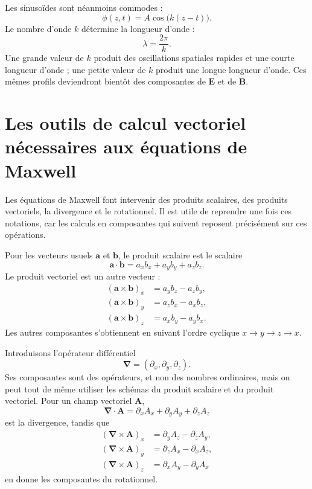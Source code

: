 Les sinusoïdes sont néanmoins commodes :
\begin{equation}
\phi(z,t)=A\cos\!\bigl(k(z-t)\bigr).
\end{equation}
Le nombre d’onde \(k\) détermine la longueur d’onde :
\begin{equation}
\lambda=\frac{2\pi}{k}.
\end{equation}
Une grande valeur de \(k\) produit des oscillations spatiales rapides et une courte longueur d’onde ; une petite valeur de \(k\) produit une longue longueur d’onde. Ces mêmes profils deviendront bientôt des composantes de \(\mathbf E\) et de \(\mathbf B\).

\section{Les outils de calcul vectoriel nécessaires aux équations de Maxwell}

Les équations de Maxwell font intervenir des produits scalaires, des produits vectoriels, la divergence et le rotationnel. Il est utile de reprendre une fois ces notations, car les calculs en composantes qui suivent reposent précisément sur ces opérations.

Pour les vecteurs usuels \(\mathbf a\) et \(\mathbf b\), le produit scalaire est le scalaire
\begin{equation}
\mathbf a\cdot\mathbf b
=a_xb_x+a_yb_y+a_zb_z.
\end{equation}
Le produit vectoriel est un autre vecteur :
\begin{align}
(\mathbf a\times\mathbf b)_x&=a_yb_z-a_zb_y,\\
(\mathbf a\times\mathbf b)_y&=a_zb_x-a_xb_z,\\
(\mathbf a\times\mathbf b)_z&=a_xb_y-a_yb_x.
\end{align}
Les autres composantes s’obtiennent en suivant l’ordre cyclique \(x\to y\to z\to x\).

Introduisons l’opérateur différentiel
\begin{equation}
\boldsymbol\nabla=
\left(\partial_x,\partial_y,\partial_z\right).
\end{equation}
Ses composantes sont des opérateurs, et non des nombres ordinaires, mais on peut tout de même utiliser les schémas du produit scalaire et du produit vectoriel. Pour un champ vectoriel \(\mathbf A\),
\begin{equation}
\boldsymbol\nabla\cdot\mathbf A
=\partial_xA_x+\partial_yA_y+\partial_zA_z
\label{eq:divergence}
\end{equation}
est la divergence, tandis que
\begin{align}
(\boldsymbol\nabla\times\mathbf A)_x
 &=\partial_yA_z-\partial_zA_y,\\
(\boldsymbol\nabla\times\mathbf A)_y
 &=\partial_zA_x-\partial_xA_z,\\
(\boldsymbol\nabla\times\mathbf A)_z
 &=\partial_xA_y-\partial_yA_x
\label{eq:curl}
\end{align}
en donne les composantes du rotationnel.

